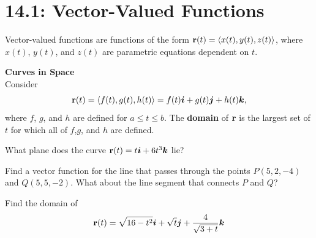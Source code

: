 \documentclass[mathNotesPreamble]{subfiles}
\begin{document}
\section{14.1: Vector-Valued Functions}

  Vector-valued functions are functions of the form ${\mathbf{r}}(t)={\left\langle x(t),y(t),z(t) \right\rangle}$, where $x(t)$, $y(t)$, and $z(t)$ are parametric equations dependent on $t$.
  
  \begin{center}
  \end{center}
  
  \textbf{Curves in Space}\\
  Consider 
    \[{\mathbf{r}}(t)={\left\langle f(t),g(t),h(t) \right\rangle}=f(t){\bm{i}}+g(t){\bm{j}}+h(t){\bm{k}},\]
  where $f$, $g$, and $h$ are defined for $a\leq t\leq b$. The \textbf{domain} of ${\mathbf{r}}$ is the largest set of $t$ for which all of $f$,$g$, and $h$ are defined.
  \vspace*{\baselineskip}

  \begin{ex*}
    What plane does the curve ${\mathbf{r}}(t)=t{\bm{i}}+6t^3{\bm{k}}$ lie?
  \end{ex*}

  \begin{ex*}
    Find a vector function for the line that passes through the points $P(5,2,-4)$ and $Q(5,5,-2)$. What about the line segment that connects $P$ and $Q$?
  \end{ex*}
  \pagebreak

  \begin{ex*}
    Find the domain of
      \[{\mathbf{r}}(t)=\sqrt{16-t^2}{\bm{i}}+\sqrt{t}{\bm{j}}+\frac{4}{\sqrt{3+t}}{\bm{k}}\]
  \end{ex*}
\end{document}
